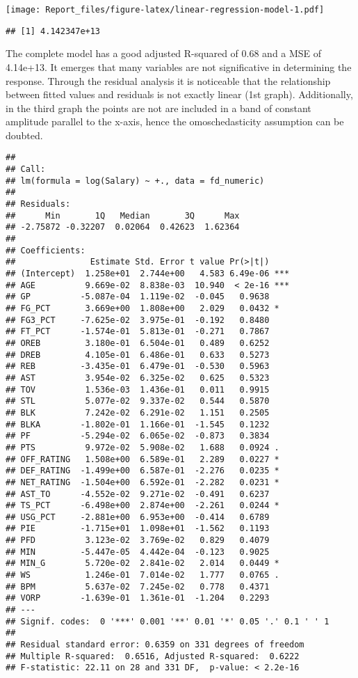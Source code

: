 \documentclass[
]{article}
\begin{document}
\texttt{[image: Report\_files/figure-latex/linear-regression-model-1.pdf]}

\begin{verbatim}
## [1] 4.142347e+13
\end{verbatim}

The complete model has a good adjusted R-squared of 0.68 and a MSE of
4.14e+13. It emerges that many variables are not significative in
determining the response. Through the residual analysis it is noticeable
that the relationship between fitted values and residuals is not exactly
linear (1st graph). Additionally, in the third graph the points are not
are included in a band of constant amplitude parallel to the x-axis,
hence the omoschedasticity assumption can be doubted.

\begin{verbatim}
## 
## Call:
## lm(formula = log(Salary) ~ +., data = fd_numeric)
## 
## Residuals:
##      Min       1Q   Median       3Q      Max 
## -2.75872 -0.32207  0.02064  0.42623  1.62364 
## 
## Coefficients:
##               Estimate Std. Error t value Pr(>|t|)    
## (Intercept)  1.258e+01  2.744e+00   4.583 6.49e-06 ***
## AGE          9.669e-02  8.838e-03  10.940  < 2e-16 ***
## GP          -5.087e-04  1.119e-02  -0.045   0.9638    
## FG_PCT       3.669e+00  1.808e+00   2.029   0.0432 *  
## FG3_PCT     -7.625e-02  3.975e-01  -0.192   0.8480    
## FT_PCT      -1.574e-01  5.813e-01  -0.271   0.7867    
## OREB         3.180e-01  6.504e-01   0.489   0.6252    
## DREB         4.105e-01  6.486e-01   0.633   0.5273    
## REB         -3.435e-01  6.479e-01  -0.530   0.5963    
## AST          3.954e-02  6.325e-02   0.625   0.5323    
## TOV          1.536e-03  1.436e-01   0.011   0.9915    
## STL          5.077e-02  9.337e-02   0.544   0.5870    
## BLK          7.242e-02  6.291e-02   1.151   0.2505    
## BLKA        -1.802e-01  1.166e-01  -1.545   0.1232    
## PF          -5.294e-02  6.065e-02  -0.873   0.3834    
## PTS          9.972e-02  5.908e-02   1.688   0.0924 .  
## OFF_RATING   1.508e+00  6.589e-01   2.289   0.0227 *  
## DEF_RATING  -1.499e+00  6.587e-01  -2.276   0.0235 *  
## NET_RATING  -1.504e+00  6.592e-01  -2.282   0.0231 *  
## AST_TO      -4.552e-02  9.271e-02  -0.491   0.6237    
## TS_PCT      -6.498e+00  2.874e+00  -2.261   0.0244 *  
## USG_PCT     -2.881e+00  6.953e+00  -0.414   0.6789    
## PIE         -1.715e+01  1.098e+01  -1.562   0.1193    
## PFD          3.123e-02  3.769e-02   0.829   0.4079    
## MIN         -5.447e-05  4.442e-04  -0.123   0.9025    
## MIN_G        5.720e-02  2.841e-02   2.014   0.0449 *  
## WS           1.246e-01  7.014e-02   1.777   0.0765 .  
## BPM          5.637e-02  7.245e-02   0.778   0.4371    
## VORP        -1.639e-01  1.361e-01  -1.204   0.2293    
## ---
## Signif. codes:  0 '***' 0.001 '**' 0.01 '*' 0.05 '.' 0.1 ' ' 1
## 
## Residual standard error: 0.6359 on 331 degrees of freedom
## Multiple R-squared:  0.6516, Adjusted R-squared:  0.6222 
## F-statistic: 22.11 on 28 and 331 DF,  p-value: < 2.2e-16
\end{verbatim}
\end{document}
